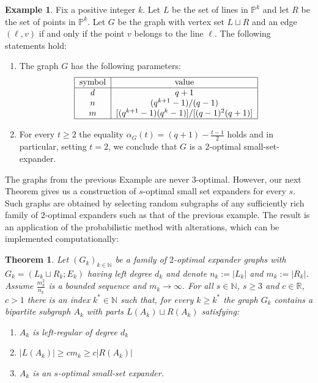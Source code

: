 \documentclass[12pt]{amsart}
\newtheorem{theorem}[lemma]{Theorem}
\theoremstyle{definition}
\newtheorem{examplex}[lemma]{Example}
\renewcommand{\geq}{\geqslant}
\newcommand{\PP}{\ensuremath{\mathbb{P}}}
\newcommand{\RR}{\ensuremath{\mathbb{R}}}
\newcommand{\1}{\ensuremath{\mathbb{1}}}
\begin{document}
\begin{examplex} \label{example: PS} Fix a positive integer $k$. Let $L$ be the set of lines in $\PP^k$ and let $R$ be the set of points in $\PP^k$. Let $G$ be the graph with vertex set $L\sqcup R$ and an edge $(\ell,v)$ if and only if the point $v$ belongs to the line $\ell$. The following statements hold:
\begin{enumerate}
\item The graph $G$ has the following parameters:
\[
\begin{tabular}{|c|c|}
\hline
symbol & value\\
\hline
$d$ & $q+1$\\
$n$ & $(q^{k+1}-1)/(q-1)$\\
$m$ & $[(q^{k+1}-1)(q^k-1)]/[(q-1)^2(q+1)]$\\
\hline
  \end{tabular}
\]
\item For every $t \geq 2$ the equality $\alpha_G(t)=(q+1)-\frac{t-1}{2}$ holds and in particular, setting $t=2$, we conclude that $G$ is a $2$-optimal small-set-expander.
\end{enumerate}
\end{examplex}



The graphs from the previous Example are never $3$-optimal. However, our next Theorem gives us a construction of $s$-optimal small set expanders for every $s$. Such graphs are obtained by selecting random subgraphs of any sufficiently rich family of $2$-optimal expanders such as that of the previous example. The result is an application of the probabilistic method with alterations, which can be implemented computationally:

\begin{theorem}\label{Thm: s_optimal_existence} Let $(G_k)_{k\in\mathbb{N}}$ be a family of $2$-optimal expander graphs with $G_k=(L_k\sqcup R_k; E_k)$ having left degree $d_k$ and denote $n_k:=|L_k|$ and $m_k:=|R_k|$. Assume $\frac{m_k^2}{n_k}$ is a bounded sequence and $m_k\rightarrow \infty$.
For all $s\in \mathbb{N}$, $s\geq 3$ and $c\in \RR$, $c>1$ there is an index $k^*\in \mathbb{N}$ such that, for every $k\geq k^*$ the graph $G_k$ contains a bipartite subgraph $A_k$ with parts $L(A_k)\sqcup R(A_k)$ satisfying:
\begin{enumerate}
\item $A_k$ is left-regular of degree $d_k$
\item $|L(A_k)|\geq cm_k\geq c|R(A_k)|$ 
\item $A_k$ is an $s$-optimal small-set expander.
\end{enumerate}
\end{theorem}
\end{document}

